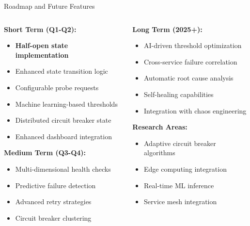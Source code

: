 \documentclass[aspectratio=169]{beamer}
\begin{document}
\begin{frame}{Roadmap and Future Features}
    \begin{columns}
        \begin{column}{0.5\textwidth}
            \textbf{Short Term (Q1-Q2):}
            \begin{itemize}
                \item \textbf{Half-open state implementation}
                \item Enhanced state transition logic
                \item Configurable probe requests
                \item Machine learning-based thresholds
                \item Distributed circuit breaker state
                \item Enhanced dashboard integration
            \end{itemize}
            
            \vspace{0.3cm}
            \textbf{Medium Term (Q3-Q4):}
            \begin{itemize}
                \item Multi-dimensional health checks
                \item Predictive failure detection
                \item Advanced retry strategies
                \item Circuit breaker clustering
            \end{itemize}
        \end{column}
        \begin{column}{0.5\textwidth}
            \textbf{Long Term (2025+):}
            \begin{itemize}
                \item AI-driven threshold optimization
                \item Cross-service failure correlation
                \item Automatic root cause analysis
                \item Self-healing capabilities
                \item Integration with chaos engineering
            \end{itemize}
            
            \vspace{0.3cm}
            \textbf{Research Areas:}
            \begin{itemize}
                \item Adaptive circuit breaker algorithms
                \item Edge computing integration
                \item Real-time ML inference
                \item Service mesh integration
            \end{itemize}
        \end{column}
    \end{columns}
\end{frame}
\end{document}
